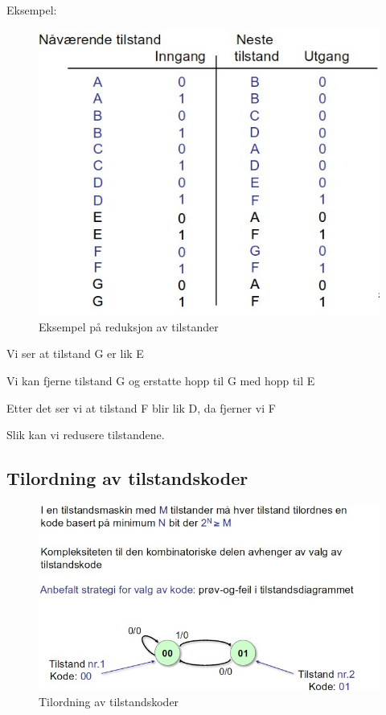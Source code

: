 \documentclass{article}
\begin{document}
	 Eksempel:
	 \begin{figure}[H]
	 	\includegraphics[scale = 0.6]{red.jpg}
	 	\caption{Eksempel på reduksjon av tilstander}
	 \end{figure}
	 
	 Vi ser at tilstand G er lik E
	 
	 Vi kan fjerne tilstand G og erstatte hopp til G med hopp til E
	 
	 Etter det ser vi at tilstand F blir lik D, da fjerner vi F
	 
	 Slik kan vi redusere tilstandene.
	 
	 	
	\subsection{Tilordning av tilstandskoder}
	\begin{figure}[H]
		\includegraphics[scale = 0.6]{tilordning.jpg}
		\caption{Tilordning av tilstandskoder}
	\end{figure}
	
\end{document}
